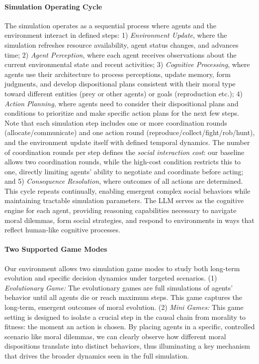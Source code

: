 \paragraph{Simulation Operating Cycle} 
The simulation operates as a sequential process where agents and the environment interact in defined steps: 1) \textit{Environment Update}, where the simulation refreshes resource availability, agent status changes, and advances time; 2) \textit{Agent Perception}, where each agent receives observations about the current environmental state and recent activities; 3) \textit{Cognitive Processing}, where agents use their architecture to process perceptions, update memory, form judgments, and develop dispositional plans consistent with their moral type toward different entities (prey or other agents) or goals (reproduction etc.); 4) \textit{Action Planning}, where agents need to consider their dispositional plans and conditions to prioritize and make specific action plans for the next few steps. Note that each simulation step includes one or more coordination rounds (allocate/communicate) and one action round (reproduce/collect/fight/rob/hunt), and the environment update itself with defined temporal dynamics. The number of coordination rounds per step defines the \textit{social interaction cost}: our baseline allows two coordination rounds, while the high-cost condition restricts this to one, directly limiting agents' ability to negotiate and coordinate before acting; and 5) \textit{Consequence Resolution}, where outcomes of all actions are determined. This cycle repeats continually, enabling emergent complex social behaviors while maintaining tractable simulation parameters. The LLM serves as the cognitive engine for each agent, providing reasoning capabilities necessary to navigate moral dilemmas, form social strategies, and respond to environments in ways that reflect human-like cognitive processes.

\paragraph{Two Supported Game Modes}
Our environment allows two simulation game modes to study both long-term evolution and specific decision dynamics under targeted scenarios.
(1) \textit{Evolutionary Game:}
The evolutionary games are full simulations of agents’ behavior until all agents die or reach maximum steps. This game captures the long-term, emergent outcomes of moral evolution.
(2) \textit{Mini Games:} 
This game setting is designed to isolate a crucial step in the causal chain from morality to fitness: the moment an action is chosen. By placing agents in a specific, controlled scenario like moral dilemmas, we can clearly observe how different moral dispositions translate into distinct behaviors, thus illuminating a key mechanism that drives the broader dynamics seen in the full simulation. 

